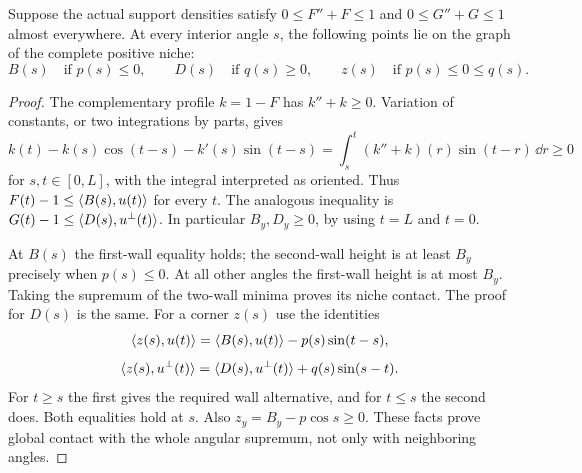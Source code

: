 \begin{lemma}\label{lem:unit-global-contact}
Suppose the actual support densities satisfy $0\le F''+F\le1$
and $0\le G''+G\le1$ almost everywhere. At every interior angle $s$,
the following points lie on the graph of the complete positive niche:
\[
 B(s)\quad\text{if }p(s)\le0,\qquad
 D(s)\quad\text{if }q(s)\ge0,\qquad
 z(s)\quad\text{if }p(s)\le0\le q(s).
\]
\end{lemma}
\begin{proof}
The complementary profile $k=1-F$ has $k''+k\ge0$.
Variation of constants, or two integrations by parts, gives
\[
 k(t)-k(s)\cos(t-s)-k'(s)\sin(t-s)
 =\int_s^t(k''+k)(r)\sin(t-r)\,\dd r\ge0
\]
for $s,t\in[0,L]$, with the integral interpreted as oriented.
Thus $F(t)-1\le\langle B(s),u(t)\rangle$ for every $t$.
The analogous inequality is
$G(t)-1\le\langle D(s),u^\perp(t)\rangle$.
In particular $B_y,D_y\ge0$, by using $t=L$ and $t=0$.

At $B(s)$ the first-wall equality holds; the second-wall height is
at least $B_y$ precisely when $p(s)\le0$.
At all other angles the first-wall height is at most $B_y$.
Taking the supremum of the two-wall minima proves its niche contact.
The proof for $D(s)$ is the same.
For a corner $z(s)$ use the identities
\[
 \langle z(s),u(t)\rangle=\langle B(s),u(t)\rangle-p(s)\sin(t-s),
\]
\[
 \langle z(s),u^\perp(t)\rangle=\langle D(s),u^\perp(t)\rangle+q(s)\sin(s-t).
\]
For $t\ge s$ the first gives the required wall alternative, and
for $t\le s$ the second does. Both equalities hold at $s$.
Also $z_y=B_y-p\cos s\ge0$. These facts prove global contact
with the whole angular supremum, not only with neighboring angles.
\end{proof}

